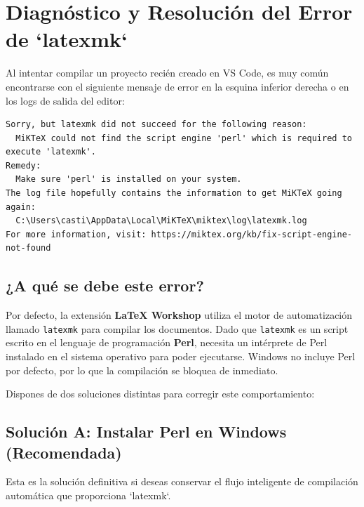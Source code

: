 \documentclass[
10pt, %
a4paper, %
oneside, %
headinclude,footinclude, %
BCOR5mm, %
]{scrartcl}
\begin{document}
\newpage
\section{Diagnóstico y Resolución del Error de `latexmk`}

Al intentar compilar un proyecto recién creado en VS Code, es muy común encontrarse con el siguiente mensaje de error en la esquina inferior derecha o en los logs de salida del editor:

\begin{lstlisting}[language=plaintext, style=miestiloclaro]
Sorry, but latexmk did not succeed for the following reason:
  MiKTeX could not find the script engine 'perl' which is required to execute 'latexmk'.
Remedy:
  Make sure 'perl' is installed on your system.
The log file hopefully contains the information to get MiKTeX going again:
  C:\Users\casti\AppData\Local\MiKTeX\miktex\log\latexmk.log
For more information, visit: https://miktex.org/kb/fix-script-engine-not-found
\end{lstlisting}

\subsection{¿A qué se debe este error?}
Por defecto, la extensión \textbf{LaTeX Workshop} utiliza el motor de automatización llamado \texttt{latexmk} para compilar los documentos. Dado que \texttt{latexmk} es un script escrito en el lenguaje de programación \textbf{Perl}, necesita un intérprete de Perl instalado en el sistema operativo para poder ejecutarse. Windows no incluye Perl por defecto, por lo que la compilación se bloquea de inmediato.

Dispones de dos soluciones distintas para corregir este comportamiento:

\subsection{Solución A: Instalar Perl en Windows (Recomendada)}
Esta es la solución definitiva si deseas conservar el flujo inteligente de compilación automática que proporciona `latexmk`.
\end{document}
